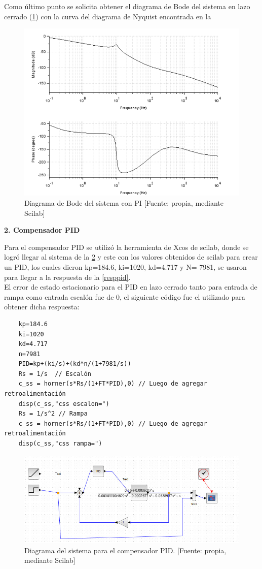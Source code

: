 \documentclass[12pt,letterpaper]{article}
\begin{document}
Como último punto se solicita obtener el diagrama de Bode del sistema en lazo cerrado (\ref{fig:bodePI}) con la curva del diagrama de Nyquist encontrada en la 

\begin{figure}[hbtp]
	\centering
	\includegraphics[width = 0.7 \columnwidth]{BodePI.png} 
	\caption[Figura7]{Diagrama de Bode del sistema con PI [Fuente: propia, mediante Scilab]} 
	\label{fig:bodePI} 
\end{figure}


\bigskip

\textbf{2. Compensador PID}

\bigskip

Para el compensador PID se utilizó la herramienta de Xcos de scilab, donde se logró llegar al sistema de la \ref{pidb} y este con los valores obtenidos de scilab para crear un PID, los cuales dieron kp=184.6, ki=1020, kd=4.717 y N= 7981, se usaron para llegar a la respuesta de la \ref{resppid}. \\

El error de estado estacionario para el PID en lazo cerrado tanto para entrada de rampa como entrada escalón fue de 0, el siguiente código fue el utilizado para obtener dicha respuesta:

\begin{verbatim}
    kp=184.6
    ki=1020
    kd=4.717
    n=7981
    PID=kp+(ki/s)+(kd*n/(1+7981/s))
    Rs = 1/s  // Escalón
    c_ss = horner(s*Rs/(1+FT*PID),0) // Luego de agregar retroalimentación
    disp(c_ss,"css escalon=")
    Rs = 1/s^2 // Rampa
    c_ss = horner(s*Rs/(1+FT*PID),0) // Luego de agregar retroalimentación
    disp(c_ss,"css rampa=")
\end{verbatim}

\begin{figure}[hbtp]
	\centering
	\includegraphics[width = .9 \columnwidth]{pidb.jpeg} 
	\caption[Figura7]{Diagrama del sistema para el compensador PID. [Fuente: propia, mediante Scilab]} 
	\label{pidb} 
\end{figure}
\end{document}
